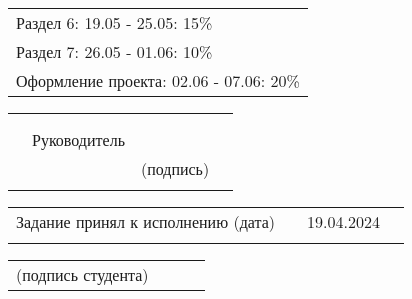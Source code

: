 \documentclass[12pt, А4, twoside]{article}
\begin{document}
\begin{FlushLeft}
\begin{tabular}{p{17.25cm}}
        \hspace{0.3cm} \textsf{Раздел 6:} \hspace{2.54cm} \textsf{ 19.05 - 25.05:} \hspace{0.5cm} \textsf{15\%} \vspace{1pt} \hline \\
        \hspace{0.3cm} \textsf{Раздел 7:} \hspace{2.54cm} \textsf{ 26.05 - 01.06:} \hspace{0.5cm} \textsf{10\%} \vspace{1pt} \hline \\
        \hspace{0.3cm} \textsf{Оформление проекта:} \hspace{0.5cm} \textsf{ 02.06 - 07.06:} \hspace{0.5cm} \textsf{20\%} \vspace{1pt} \hline \\
    \end{tabular} 

    \begin{tabular}{p{4.2cm} p{3.8cm} p{6.0cm} p{2.0cm}} 
        & & & 
        \\ 
        & & & 
        \\
        & \fontsize{14}{17.5} \textrm{Руководитель} & 
        \vspace{1pt} \hline & 
        \\ 
        & & \centering \fontsize{12}{15} \textsf{(подпись)} & 
        \\ 
        & & &
    \end{tabular} 

\fontsize{12}{15}

    \begin{tabular}{p{7.5cm} p{0.5cm} p{6.0cm} p{2.0cm}} 
        \textsf{Задание принял к исполнению (дата)} & &
        \centering \textsf{19.04.2024} \vspace{1pt} \hline & 
        \\ 
        & & & 
    \end{tabular} 

    \begin{tabular}{p{4.0cm} p{0.2cm} p{9.8cm} p{2.0cm}}
        \textsf{(подпись студента)} & &
        \vspace{1pt} \hline & 
        \\ 
    \end{tabular} 

\end{FlushLeft} 
\end{document}
